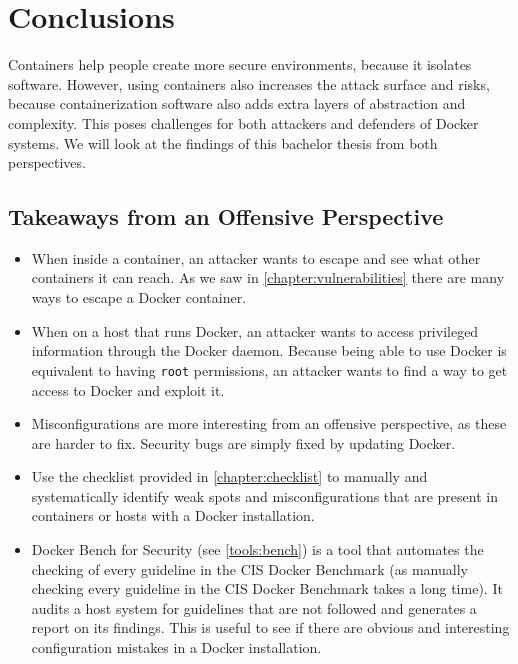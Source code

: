 \chapter{Conclusions}\label{chapter:conclusions}
Containers help people create more secure environments, because it isolates software. However, using containers also increases the attack surface and risks, because containerization software also adds extra layers of abstraction and complexity. This poses challenges for both attackers and defenders of Docker systems. We will look at the findings of this bachelor thesis from both perspectives.

\section{Takeaways from an Offensive Perspective}

\begin{itemize}
    \item When inside a container, an attacker wants to escape and see what other containers it can reach. As we saw in \autoref{chapter:vulnerabilities} there are many ways to escape a Docker container.

    \item When on a host that runs Docker, an attacker wants to access privileged information through the Docker daemon. Because being able to use Docker is equivalent to having \lstinline{root} permissions, an attacker wants to find a way to get access to Docker and exploit it.

    \item Misconfigurations are more interesting from an offensive perspective, as these are harder to fix. Security bugs are simply fixed by updating Docker.

    \item Use the checklist provided in \autoref{chapter:checklist} to manually and systematically identify weak spots and misconfigurations that are present in containers or hosts with a Docker installation.

    \item Docker Bench for Security (see \autoref{tools:bench}) is a tool that automates the checking of every guideline in the CIS Docker Benchmark (as manually checking every guideline in the CIS Docker Benchmark takes a long time). It audits a host system for guidelines that are not followed and generates a report on its findings. This is useful to see if there are obvious and interesting configuration mistakes in a Docker installation.

\end{itemize}

